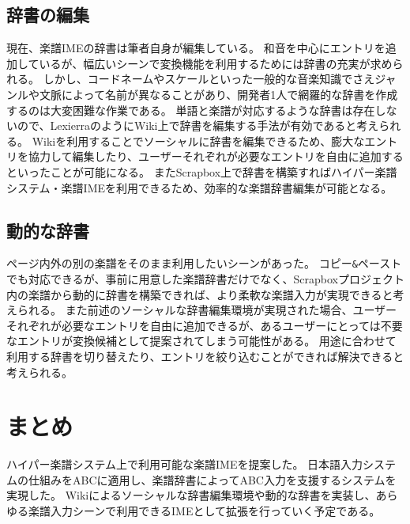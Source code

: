 \subsection{辞書の編集}
現在、楽譜IMEの辞書は筆者自身が編集している。
和音を中心にエントリを追加しているが、幅広いシーンで変換機能を利用するためには辞書の充実が求められる。
しかし、コードネームやスケールといった一般的な音楽知識でさえジャンルや文脈によって名前が異なることがあり、開発者1人で網羅的な辞書を作成するのは大変困難な作業である。
単語と楽譜が対応するような辞書は存在しないので、Lexierra\cite{Masui}のようにWiki上で辞書を編集する手法が有効であると考えられる。
Wikiを利用することでソーシャルに辞書を編集できるため、膨大なエントリを協力して編集したり、ユーザーそれぞれが必要なエントリを自由に追加するといったことが可能になる。
またScrapbox上で辞書を構築すればハイパー楽譜システム・楽譜IMEを利用できるため、効率的な楽譜辞書編集が可能となる。

\subsection{動的な辞書}
ページ内外の別の楽譜をそのまま利用したいシーンがあった。
コピー\verb|&|ペーストでも対応できるが、事前に用意した楽譜辞書だけでなく、Scrapboxプロジェクト内の楽譜から動的に辞書を構築できれば、より柔軟な楽譜入力が実現できると考えられる。
また前述のソーシャルな辞書編集環境が実現された場合、ユーザーそれぞれが必要なエントリを自由に追加できるが、あるユーザーにとっては不要なエントリが変換候補として提案されてしまう可能性がある。
用途に合わせて利用する辞書を切り替えたり、エントリを絞り込むことができれば解決できると考えられる。

\section{まとめ}
ハイパー楽譜システム上で利用可能な楽譜IMEを提案した。
日本語入力システムの仕組みをABCに適用し、楽譜辞書によってABC入力を支援するシステムを実現した。
Wikiによるソーシャルな辞書編集環境や動的な辞書を実装し、あらゆる楽譜入力シーンで利用できるIMEとして拡張を行っていく予定である。